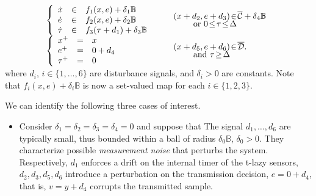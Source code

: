 \documentclass[twocolumn]{autart}
\begin{document}
{\begin{equation}
\begin{array}{ll}
	\left\{ \begin{array}{lll}
		\dot{x} &\in& f_1(x,e) + \delta_1 \mathbb{B}\\
		\dot{e} &\in& f_2(x,e) + \delta_2 \mathbb{B}\\
		\dot{\tau} &\in& f_3(\tau+d_1) + \delta_3 \mathbb{B}\\
	 \end{array}\right. & 
	 \begin{array}{l}
	  \quad
	  (x+d_2,e+d_3)\!\in\! \overline{\mathcal{C}}+ \delta_4 \mathbb{B} \vspace{-1mm}\\
	  \quad\qquad\mbox{ or } 0 \!\leq\! \tau \!\leq\! \Delta \\	  
	 \end{array} \\
	\left\{\begin{array}{lll}
		x^+ &=& x \\
		e^+ &=& 0+d_4\\ 
		\tau^+ &=& 0\\
	\end{array} \right. & 
	 \begin{array}{l}
	  \quad
	  (x+d_5,e+d_6)\!\in\! \overline{\mathcal{D}}. \vspace{-1mm}\\
	  \quad\qquad\mbox{ and } \tau \!\geq\! \Delta \\	  
	 \end{array} \vspace{-2mm}\\ 
 \end{array} \vspace{1mm}
\end{equation}
where $d_i$, $i\in\{1,\dots,6\}$ are disturbance signals, and
$\delta_i>0$ are constants. Note that $f_i(x,e) + \delta_i \mathbb{B}$ 
is now a set-valued map for each $i\in\{1,2,3\}$.

We can identify the following three cases of interest.
\begin{itemize}
\item Consider $\delta_1=\delta_2=\delta_3=\delta_4 = 0$ and suppose that
The signal $d_1,\dots, d_6$ are typically small, thus 
bounded within a ball of radius $\delta_0 \mathbb{B}$, $\delta_0 >0$. 
They characterize 
possible \emph{measurement noise} that perturbs the system. Respectively,
$d_1$ enforces a drift on the internal timer of the t-lazy sensors, 
$d_2,d_3,d_5,d_6$ introduce a perturbation on the transmission decision, 
$e=0+d_4$, that is, $v=y+d_4$ corrupts the transmitted
sample.


\end{itemize}}
\end{document}
